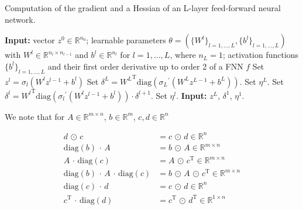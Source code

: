 \begin{algorithm}[H]
    \caption{Computation of the gradient and a Hessian of an L-layer feed-forward neural network.}
    \begin{algorithmic}[1]
        \State \textbf{Input:} vector $z^0 \in \mathbb{R}^{n_0}$; learnable parameters $\theta = (\{ W^l \}_{l = 1, \ldots, L}, \{ b^l \}_{l = 1, \ldots, L})$ with $W^l \in \mathbb{R}^{n_l \times n_{l-1}}$ and $b^l \in \mathbb{R}^{n_l}$ for $l = 1, \ldots, L$, where $n_L = 1$; activation functions $\{ b^l \}_{l = 1, \ldots, L}$ and their first order derivative up to order 2 of a FNN $f$
            \State Set $z^l = \sigma_l(W^l z^{l-1} + b^l)$
        \EndFor
        \State Set $\delta^{L} = {W^{L}}^{\mathrm{T}} \mathrm{diag}({\sigma_{L}}^{\prime}(W^{L} z^{L-1} + b^{L}))$.
        \State Set $\eta^{L}$.
            \State Set $\delta^{l} = {W^{l}}^{\mathrm{T}} \mathrm{diag}({\sigma_{l}}^{\prime}(W^{l} z^{l-1} + b^{l})) \cdot \delta^{l+1}$.
            \State Set $\eta^{l}$.
        \EndFor
        \State \textbf{Input:} $z^L$, $\delta^1$, $\eta^1$.
    \end{algorithmic}
\end{algorithm}




  






We note that for $A \in \mathbb{R}^{m \times n}$, $b \in \mathbb{R}^{m}$, $c, d \in \mathbb{R}^{n}$

\begin{align*}
    d \, \odot \, c &= c \, \odot \, d \in \mathbb{R}^{n} \\
    \mathrm{diag}(b) \, \cdot \, A &= b \, \odot \, A \in \mathbb{R}^{m \times n} \\
    A \, \cdot \, \mathrm{diag}(c) &= A \, \odot \, c^{\mathrm{T}} \in \mathbb{R}^{m \times n} \\
    \mathrm{diag}(b) \, \cdot \, A \, \cdot \, \mathrm{diag}(c) &= b \, \odot \, A \, \odot \, c^{\mathrm{T}} \in \mathbb{R}^{m \times n} \\
    \mathrm{diag}(c) \, \cdot \, d &= c \, \odot \, d \in \mathbb{R}^{n} \\
    c^{\mathrm{T}} \, \cdot \, \mathrm{diag}(d) &= c^{\mathrm{T}} \, \odot \, d^{\mathrm{T}} \in \mathbb{R}^{1 \times n} \\
\end{align*}







